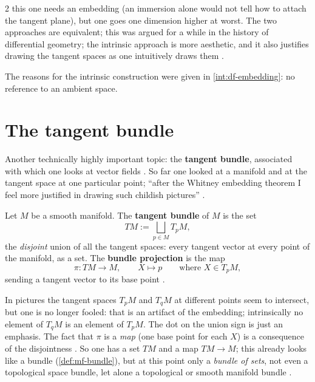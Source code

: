 \begin{paracol}{2}
this one needs an embedding (an immersion alone would not tell how to attach the tangent plane), but one goes one dimension higher at worst. The two approaches are equivalent; this was argued for a while in the history of differential geometry; the intrinsic approach is more aesthetic, and it also justifies drawing the tangent spaces as one intuitively draws them
     .
\begin{recall}
The reasons for the intrinsic construction were given in \cref{int:df-embedding}: no reference to an ambient space.
\end{recall}

\section{The tangent bundle}\label{sec:tb-bundle}

Another technically highly important topic: the \textbf{tangent bundle}, associated with which one looks at vector fields  . So far one looked at a manifold and at the tangent space at one particular point; ``after the Whitney embedding theorem I feel more justified in drawing such childish pictures''  .
\begin{definition}\label{def:tb-bundle}
Let $M$ be a smooth manifold. The \textbf{tangent bundle} of $M$ is the set
\[
  TM:=\bigsqcup_{p\in M}T_pM,
\]
the \emph{disjoint} union of all the tangent spaces: every tangent vector at every point of the manifold, as a set. The \textbf{bundle projection} is the map
\[
  \pi\colon TM\to M,\qquad X\mapsto p\qquad\text{where }X\in T_pM,
\]
sending a tangent vector to its base point      .
\end{definition}
In pictures the tangent spaces $T_pM$ and $T_qM$ at different points seem to intersect, but one is no longer fooled: that is an artifact of the embedding; intrinsically no element of $T_qM$ is an element of $T_pM$. The dot on the union sign is just an emphasis. The fact that $\pi$ is a \emph{map} (one base point for each $X$) is a consequence of the disjointness
     .
So one has a set $TM$ and a map $TM\to M$; this already looks like a bundle (\cref{def:mf-bundle}), but at this point only a \emph{bundle of sets}, not even a topological space bundle, let alone a topological or smooth manifold bundle   .


\end{paracol}
